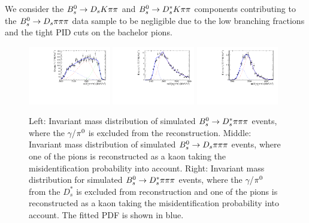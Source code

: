 
We consider the ${{B}^0_{s}}\rightarrow D_s K{\pi}{\pi}$ and ${{B}^0_{s}}\rightarrow D_s^{*}K{\pi}{\pi}$ components contributing to the ${{B}^0_{s}}\rightarrow D_s \pi{\ensuremath{\pi}}{\ensuremath{\pi}}$ data sample to be negligible 
due to the low branching fractions and the tight PID cuts on the bachelor pions.

\begin{figure}[t]
\centering
\includegraphics[height=!,width=0.32\textwidth]{figs/MassFit/BkgShape/Bs2Dsstartpipipi.pdf}
\includegraphics[height=!,width=0.32\textwidth]{figs/MassFit/BkgShape/Bs2Dspipipi_as_DsKpipi.pdf}
\includegraphics[height=!,width=0.32\textwidth]{figs/MassFit/BkgShape/Bs2Dsstarpipipi_as_DsKpipi.pdf}
\caption{
Left: Invariant mass distribution of simulated ${{B}^0_{s}}\rightarrow D_s^{*}{\pi}{\pi}{\pi}$ events, where the $\gamma$/${{\pi}^0}$ is excluded from the reconstruction. 
Middle: Invariant mass distribution of  simulated ${{B}^0_{s}}\rightarrow{\ensuremath{{D}_{s}}}{\ensuremath{\pi}}{\ensuremath{\pi}}{\ensuremath{\pi}}$ events, where one of the pions is reconstructed as a kaon taking the misidentification probability into account. 
Right: Invariant mass distribution for simulated ${{B}^0_{s}}\rightarrow D_s^{*}{\pi}{\pi}{\pi}$ events, where the $\gamma$/${{\pi}^0}$ from the $D_s^{*}$ is excluded from reconstruction
and one of the pions is reconstructed as a kaon taking the misidentification probability into account. The fitted PDF is shown in blue.}
\label{fig:bgkShapes}
\end{figure}
 


